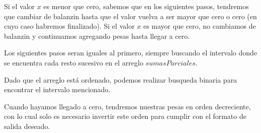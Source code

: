 Si el valor $x$ es menor que cero, sabemos que en los siguientes pasos, tendremos que cambiar de balanzin hasta que el valor vuelva a ser mayor que cero o cero (en cuyo caso habremos finalizado).
Si el valor $x$ es mayor que cero, no cambiamos de balanzin y continuamos agregando pesas hasta llegar a cero.

Los siguientes pasos seran iguales al primero, siempre buscando el intervalo donde se encuentra cada resto sucesivo en el arreglo $sumasParciales$. 

Dado que el arreglo está ordenado, podemos realizar busqueda binaria para encontrar el intervalo mencionado.

Cuando hayamos llegado a cero, tendremos nuestras pesas en orden decreciente, con lo cual solo es necesario invertir este orden para cumplir con el formato de salida deseado.